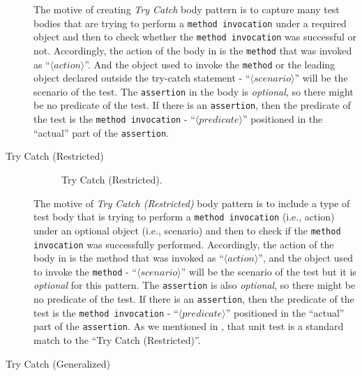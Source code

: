 \documentclass[proposal.tex]{subfiles}
\begin{document}
\begin{description}
The motive of creating \textit{Try Catch} body pattern is to capture many test bodies that are trying to perform a \texttt{method invocation} under a required object and then to check whether the \texttt{method invocation} was successful or not.
%
Accordingly, the action of the body in  is the \texttt{method} that was invoked as \enquote{$\langle action \rangle$}.
%
And the object used to invoke the \texttt{method} or the leading object declared outside the try-catch statement - \enquote{$\langle scenario \rangle$} will be the scenario of the test.
%
The \texttt{assertion} in the body is \emph{optional}, so there might be no predicate of the test.
%
If there is an \texttt{assertion}, then the predicate of the test is the \texttt{method invocation} - \enquote{$\langle predicate \rangle$} positioned in the \enquote{actual} part of the \texttt{assertion}.


\item[Try Catch (Restricted)] 

\begin{figure}[t]
\centering
    \begin{subfigure}{0.8\textwidth}
    \end{subfigure}
\caption{Try Catch (Restricted).}
\label{tc_one}
\end{figure}

The motive of \textit{Try Catch (Restricted)} body pattern is to include a type of test body that is trying to perform a \texttt{method invocation} (i.e., action) under an optional object (i.e., scenario) and then to check if the \texttt{method invocation} was successfully performed.
%
Accordingly, the action of the body in  is the method that was invoked as \enquote{$\langle action \rangle$}, and the object used to invoke the \texttt{method} - \enquote{$\langle scenario \rangle$} will be the scenario of the test but it is \emph{optional} for this pattern.
%
The \texttt{assertion} is also \emph{optional}, so there might be no predicate of the test.
%
If there is an \texttt{assertion}, then the predicate of the test is the \texttt{method invocation} - \enquote{$\langle predicate \rangle$} positioned in the \enquote{actual} part of the \texttt{assertion}.
%
As we mentioned in , that unit test is a standard match to the \enquote{Try Catch (Restricted)}.


\item[Try Catch (Generalized)] 



\end{description}
\end{document}
